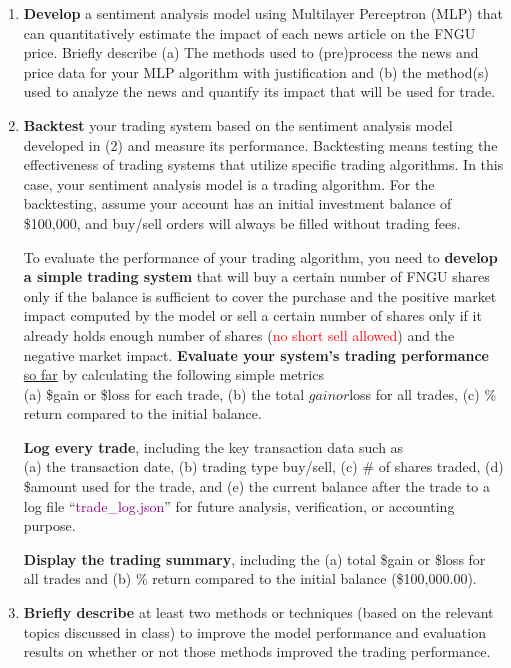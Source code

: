 \documentclass[twocolumn,12pt]{article}
\begin{document}
\begin{flushleft}
\begin{enumerate}
	\item \textbf{Develop} a sentiment analysis model using Multilayer Perceptron (MLP) that can quantitatively estimate the impact of each news article on the FNGU price. Briefly describe 
		\subitem (a) The methods used to (pre)process the news and price data for your MLP algorithm with justification and 
		\subitem (b) the method(s) used to analyze the news and quantify its impact that will be used for trade.
	
	\item \textbf{Backtest} your trading system based on the sentiment analysis model developed in (2) and measure its performance. Backtesting means testing the effectiveness of trading systems that utilize specific trading algorithms. In this case, your sentiment analysis model is a trading algorithm. For the backtesting, assume your account has an initial investment balance of \$100,000, and buy/sell orders will always be filled without trading fees. 

	To evaluate the performance of your trading algorithm, you need to \textbf{develop a simple trading system} that will buy a certain number of FNGU shares only if the balance is sufficient to cover the purchase and the positive market impact computed by the model or sell a certain number of shares only if it already holds enough number of shares (\textcolor{red}{no short sell allowed}) and the negative market impact. 
	\textbf{Evaluate your system’s trading performance} \underline{so far} by calculating the following simple metrics\\
		\subitem (a) \$gain or \$loss for each trade, 
		\subitem (b) the total $gain or $loss for all trades, 
		\subitem (c) \% return compared to the initial balance. 
		
	\textbf{Log every trade}, including the key transaction data such as\\
		\subitem (a) the transaction date, 
		\subitem (b) trading type buy/sell, 
		\subitem (c) \# of shares traded, 
		\subitem (d) \$amount used for the trade, and 
		\subitem (e) the current balance after the trade to a log file \enquote{\textcolor{purple}{trade\_log.json}} for future analysis, verification, or accounting purpose.
		
	\textbf{Display the trading summary}, including the 
		\subitem (a) total \$gain or \$loss for all trades and
		\subitem (b) \% return compared to the initial balance (\$100,000.00).

	\item \textbf{Briefly describe} at least two methods or techniques (based on the relevant topics discussed in class) to improve the model performance and evaluation results on whether or not those methods improved the trading performance.
	

\end{enumerate}
\end{flushleft}
\end{document}
